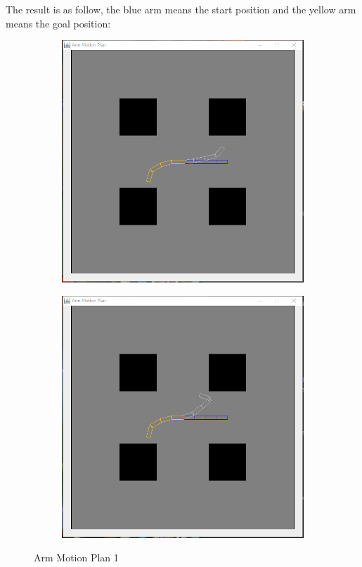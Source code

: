 \documentclass{article}
\begin{document}
The result is as follow, the blue arm means the start position and the yellow arm means the goal position:
\begin{figure}[!htb]
\centering
\begin{subfigure}{0.4\textwidth}
  \includegraphics[width=\linewidth]{arm_1}
\end{subfigure}
\begin{subfigure}{0.4\textwidth}
  \includegraphics[width=\linewidth]{arm_2}
\end{subfigure}
\caption{Arm Motion Plan 1}
\end{figure}
\end{document}

